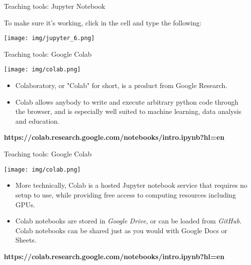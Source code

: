 \documentclass[11pt]{beamer}
\begin{document}
\begin{frame}{Teaching tools: Jupyter Notebook}

To make sure it’s working, click in the cell and type the following:

\begin{center}
\texttt{[image: img/jupyter\_6.png]} 
\end{center}
\end{frame}
%
%
\begin{frame}{Teaching tools: Google Colab}
	\noindent\begin{minipage}{0.5\textwidth}
		\texttt{[image: img/colab.png]}
	\end{minipage}%
	\hfill%
	\begin{minipage}{0.5\textwidth}
		\begin{itemize}
			\item Colaboratory, or "Colab" for short, is a product from Google Research. \item Colab allows anybody to write and execute arbitrary python code through the browser, and is especially well suited to machine learning, data analysis and education. 
		\end{itemize}
	\end{minipage}
\vfill
\footnotesize{\textbf{https://colab.research.google.com/notebooks/intro.ipynb?hl=en}}
\end{frame}
\begin{frame}{Teaching tools: Google Colab}
	\noindent\begin{minipage}{0.5\textwidth}
		\texttt{[image: img/colab.png]}
	\end{minipage}%
	\hfill%
	\begin{minipage}{0.5\textwidth}
		\begin{itemize}
\item More technically, Colab is a hosted Jupyter notebook service that requires no setup to use, while providing free access to computing resources including GPUs.
\item Colab notebooks are stored in \textit{Google Drive}, or can be loaded from \textit{GitHub}. Colab notebooks can be shared just as you would with Google Docs or Sheets.
		\end{itemize}
	\end{minipage}
\vfill	
\footnotesize{\textbf{https://colab.research.google.com/notebooks/intro.ipynb?hl=en}}
\end{frame}
\end{document}
